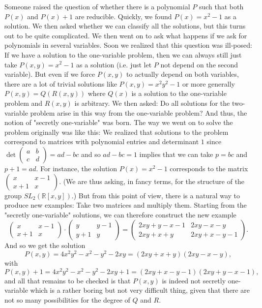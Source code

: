 \documentclass[11pt]{article}
\theoremstyle{definition}
\begin{document}
\begin{solution}[name={Solution by Tintarn}]
	Someone raised the question of whether there is a polynomial $P$ such that both $P(x)$ and $P(x)+1$ are reducible. Quickly, we found $P(x)=x^2-1$ as a solution. We then asked whether we can classify all the solutions, but this turns out to be quite complicated.
	We then went on to ask what happens if we ask for polynomials in several variables. Soon we realized that this question was ill-posed: If we have a solution to the one-variable problem, then we can always still just take $P(x,y)=x^2-1$ as a solution (i.e. just let $P$ not depend on the second variable).
	But even if we force $P(x,y)$ to actually depend on both variables, there are a lot of trivial solutions like $P(x,y)=x^2y^2-1$ or more generally $P(x,y)=Q(R(x,y))$ where $Q(x)$ is a solution to the one-variable problem and $R(x,y)$ is arbitrary.
	We then asked: Do all solutions for the two-variable problem arise in this way from the one-variable problem? And thus, the notion of "secretly one-variable" was born.
	The way we went on to solve the problem originally was like this: We realized that solutions to the problem correspond to matrices with polynomial entries and determinant $1$ since $\det \begin{pmatrix} a & b\\c & d \end{pmatrix}=ad-bc$ and so $ad-bc=1$ implies that we can take $p=bc$ and $p+1=ad$. For instance, the solution $P(x)=x^2-1$ corresponds to the matrix $\begin{pmatrix} x & x-1\\x+1 & x \end{pmatrix}$.
	(We are thus asking, in fancy terms, for the structure of the group $SL_2(\mathbb{R}[x,y])$.)
	But from this point of view, there is a natural way to produce new examples: Take two matrices and multiply them.
	Starting from the "secretly one-variable" solutions, we can therefore construct the new example
	\[\begin{pmatrix} x & x-1\\x+1 & x \end{pmatrix} \cdot \begin{pmatrix} y & y-1\\y+1 & y \end{pmatrix}=\begin{pmatrix} 2xy+y-x-1 & 2xy-x-y\\2xy+x+y & 2xy+x-y-1 \end{pmatrix}.\]And so we get the solution
	\[P(x,y)=4x^2y^2-x^2-y^2-2xy=(2xy+x+y)(2xy-x-y),\]with
	\[P(x,y)+1=4x^2y^2-x^2-y^2-2xy+1=(2xy+x-y-1)(2xy+y-x-1),\]and all that remains to be checked is that $P(x,y)$ is indeed not secretly one-variable which is a rather boring but not very difficult thing, given that there are not so many possibilities for the degree of $Q$ and $R$.
\end{solution}
\end{document}
